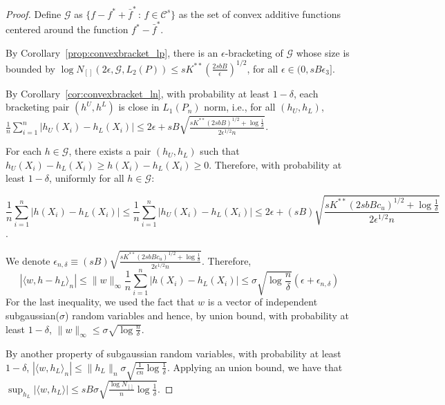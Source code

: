 \begin{proof}
Define $\mathcal{G}$ as $\{ f - f^* + \bar{f}^* \,:\, f \in \mathcal{C}^s\}$ as the set of convex additive functions centered around the function $f^* - \bar{f}^*$. 

By Corollary~\ref{prop:convexbracket_lp}, there is an $\epsilon$-bracketing of $\mathcal{G}$ whose size is bounded by $\log N_{[]}( 2\epsilon, \mathcal{G}, L_2(P)) \leq sK^{**} \left( \frac{2sbB}{\epsilon} \right)^{1/2}$, for all $\epsilon \in (0, sB \epsilon_3]$.

By Corollary~\ref{cor:convexbracket_ln}, with probability at least $1-\delta$, each bracketing pair $(h^U, h^L)$ is close in $L_1(P_n)$ norm, i.e., for all $(h_U, h_L)$, 
$\frac{1}{n} \sum_{i=1}^n | h_U(X_i) - h_L(X_i) | \leq 2 \epsilon + sB \sqrt{ \frac{sK^{**}(2sbB
)^{1/2} + \log \frac{1}{\delta}}{2\epsilon^{1/2} n}}$.

For each $h \in \mathcal{G}$, there exists a pair $(h_U, h_L)$ such that $h_U(X_i) - h_L(X_i) \geq h(X_i) - h_L(X_i) \geq 0$. Therefore, with probability at least $1-\delta$, uniformly for all $h \in \mathcal{G}$:

$$
\frac{1}{n} \sum_{i=1}^n |h(X_i) - h_L(X_i)| \leq \frac{1}{n} \sum_{i=1}^n | h_U(X_i) - h_L(X_i)| \leq 2\epsilon +  (sB) \sqrt{ \frac{sK^{**}(2sbBc_u)^{1/2} + \log \frac{1}{\delta}}{2\epsilon^{1/2} n}}
$$.

We denote $\epsilon_{n,\delta} \equiv (sB) \sqrt{ \frac{sK^{**}(2sbBc_u)^{1/2} + \log \frac{1}{\delta}}{2\epsilon^{1/2} n}}$. 
Therefore,  
\[
|\langle w, h - h_L\rangle_n| \leq \| w \|_\infty \frac{1}{n} \sum_{i=1}^n |h(X_i) - h_L(X_i)| \leq
  \sigma \sqrt{\log \frac{n}{\delta}} \left( \epsilon + \epsilon_{n,\delta} \right)
\]
For the last inequality, we used the fact that $w$ is a vector of independent subgaussian($\sigma$) random variables and hence, by union bound, with probability at least $1-\delta$, $\| w \|_\infty \leq \sigma \sqrt{\log \frac{n}{\delta}}$. 

By another property of subgaussian random variables, with probability at least $1-\delta$, $|\langle w, h_L \rangle_n | \leq \| h_L \|_n \sigma \sqrt{ \frac{1}{cn} \log \frac{1}{\delta} }$. Applying an union bound, we have that 
$\sup_{h_L} |\langle w, h_L \rangle| \leq sB \sigma \sqrt{ \frac{\log N_{[]}}{n} \log \frac{1}{\delta}}$.


\end{proof}
